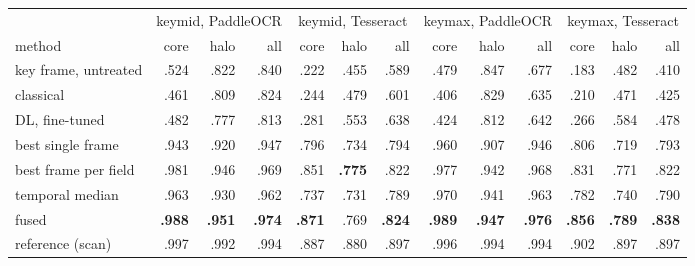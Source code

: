 \begin{tabular}{lrrrrrrrrrrrr}
\toprule
 & \multicolumn{3}{c}{keymid, PaddleOCR} & \multicolumn{3}{c}{keymid, Tesseract} & \multicolumn{3}{c}{keymax, PaddleOCR} & \multicolumn{3}{c}{keymax, Tesseract} \\
\cmidrule(lr){2-4}\cmidrule(lr){5-7}\cmidrule(lr){8-10}\cmidrule(lr){11-13}
method & core & halo & all & core & halo & all & core & halo & all & core & halo & all \\
\midrule
key frame, untreated & .524 & .822 & .840 & .222 & .455 & .589 & .479 & .847 & .677 & .183 & .482 & .410 \\
classical & .461 & .809 & .824 & .244 & .479 & .601 & .406 & .829 & .635 & .210 & .471 & .425 \\
DL, fine-tuned & .482 & .777 & .813 & .281 & .553 & .638 & .424 & .812 & .642 & .266 & .584 & .478 \\
best single frame & .943 & .920 & .947 & .796 & .734 & .794 & .960 & .907 & .946 & .806 & .719 & .793 \\
best frame per field & .981 & .946 & .969 & .851 & \textbf{.775} & .822 & .977 & .942 & .968 & .831 & .771 & .822 \\
temporal median & .963 & .930 & .962 & .737 & .731 & .789 & .970 & .941 & .963 & .782 & .740 & .790 \\
fused & \textbf{.988} & \textbf{.951} & \textbf{.974} & \textbf{.871} & .769 & \textbf{.824} & \textbf{.989} & \textbf{.947} & \textbf{.976} & \textbf{.856} & \textbf{.789} & \textbf{.838} \\
\midrule
reference (scan) & .997 & .992 & .994 & .887 & .880 & .897 & .996 & .994 & .994 & .902 & .897 & .897 \\
\bottomrule
\end{tabular}
